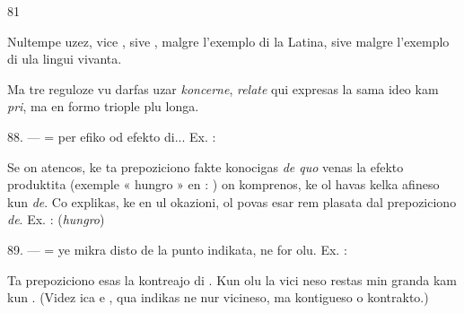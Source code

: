 \begin{VUpage}[85]{81}

Nultempe uzez, vice , sive , malgre l'exemplo di la\nl
Latina, sive  malgre l'exemplo di ula lingui vivanta.

Ma tre reguloze vu darfas uzar \textit{koncerne}, \textit{relate} qui\nl
expresas la sama ideo kam \textit{pri}, ma en formo triople plu\nl
longa.

\VUblanc{5.53pt}%
88. ---  = per efiko od efekto di... Ex. : \nl
{}\nl
{}\nl
{}

Se on atencos, ke ta prepoziciono fakte konocigas \textit{de quo}\nl
venas la efekto produktita (exemple « hungro » en : \nl
{}) on komprenos, ke ol havas kelka afineso\nl
kun \textit{de}. Co explikas, ke en ul okazioni, ol povas esar rem\cc
plasata dal prepoziciono \textit{de}. Ex. : \cc
{} (\textit{hungro}) \nl
{}

\VUblanc{5.53pt}%
89. ---  = ye mikra disto de la punto indikata,\nl
ne for olu. Ex. : \nl
{}

Ta prepoziciono esas la kontreajo di . Kun olu la vici\cc
neso restas min granda kam kun . (Videz ica e , qua\nl
indikas ne nur vicineso, ma kontigueso o kontrakto.)


\end{VUpage}
